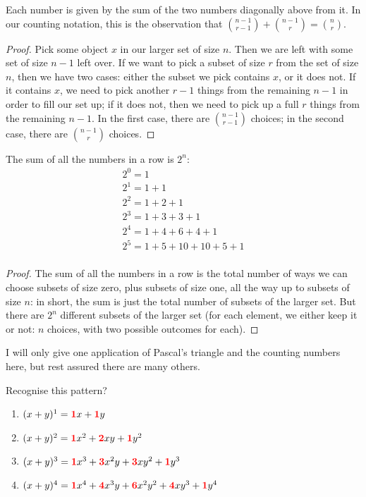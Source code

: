 \begin{obs}
  Each number is given by the sum of the two numbers diagonally above from it. In our counting notation, this is the observation
  that $ \binom{n - 1}{r - 1} + \binom{n - 1}{r} = \binom{n}{r} $.
\end{obs}
\begin{proof}
  Pick some object $ x $ in our larger set of size $ n $. Then we are left with some set of size $ n - 1 $ left over. If we want to pick
  a subset of size $ r $ from the set of size $ n $, then we have two cases: either the subset we pick contains $ x $, or it does not. If
  it contains $ x $, we need to pick another $ r - 1 $ things from the remaining $ n - 1 $ in order to fill our set up; if it does not,
  then we need to pick up a full $ r $ things from the remaining $ n - 1 $. In the first case, there are $ \binom{n - 1}{r - 1} $ choices;
  in the second case, there are $ \binom{n - 1}{r} $ choices.
\end{proof}


\begin{obs}
  The sum of all the numbers in a row is $ 2^n $:
  \begin{gather*}
    2^0 = 1\\
    2^1 = 1 + 1\\
    2^2 = 1 + 2 + 1\\
    2^3 = 1 + 3 + 3 + 1\\
    2^4 = 1 + 4 + 6 + 4 + 1\\
    2^5 = 1 + 5 + 10 + 10 + 5 + 1\\
  \end{gather*}
\end{obs}
\begin{proof}
  The sum of all the numbers in a row is the total number of ways we can choose subsets of size zero, plus subsets
  of size one, all the way up to subsets of size $ n $: in short, the sum is just the total number of subsets of the
  larger set. But there are $ 2^n $ different subsets of the larger set (for each element, we either keep it or not: $ n $ choices,
  with two possible outcomes for each).
\end{proof}

I will only give one application of Pascal's triangle and the counting numbers here, but rest assured there are many others.

\begin{ex}
  Recognise this pattern?
  \begin{enumerate}
    \item $ (x + y)^1 = {\bf\color{red}1}x + {\bf\color{red}1}y $
    \item $ (x + y)^2 = {\bf\color{red}1}x^2 + {\bf\color{red}2}xy + {\bf\color{red}1}y^2 $
    \item $ (x + y)^3 = {\bf\color{red}1}x^3 + {\bf\color{red}3}x^2y + {\bf\color{red}3}xy^2 + {\bf\color{red}1}y^3 $
    \item $ (x + y)^4 = {\bf\color{red}1}x^4 + {\bf\color{red}4}x^3 y + {\bf\color{red}6}x^2 y^2 + {\bf\color{red}4}x y^3 + {\bf\color{red}1}y^4 $
  \end{enumerate}
\end{ex}


